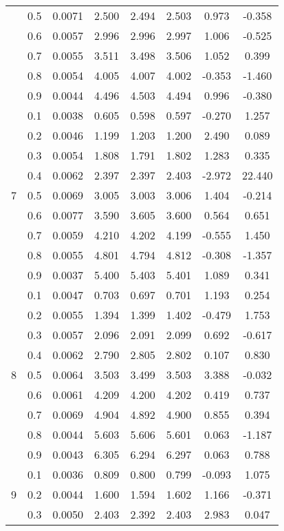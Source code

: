 \documentclass[11pt,a4paper]{report}
\begin{document}
\begin{longtable}{ | c | c || c | c | c | c | c | c | }
 & 0.5 & 0.0071 & 2.500 & 2.494 & 2.503 & 0.973 & -0.358 \\
 & 0.6 & 0.0057 & 2.996 & 2.996 & 2.997 & 1.006 & -0.525 \\
 & 0.7 & 0.0055 & 3.511 & 3.498 & 3.506 & 1.052 & 0.399 \\
 & 0.8 & 0.0054 & 4.005 & 4.007 & 4.002 & -0.353 & -1.460 \\
 & 0.9 & 0.0044 & 4.496 & 4.503 & 4.494 & 0.996 & -0.380 \\
 \hline
\multirow{9}{*}{7} & 0.1 & 0.0038 & 0.605 & 0.598 & 0.597 & -0.270 & 1.257 \\
 & 0.2 & 0.0046 & 1.199 & 1.203 & 1.200 & 2.490 & 0.089 \\
 & 0.3 & 0.0054 & 1.808 & 1.791 & 1.802 & 1.283 & 0.335 \\
 & 0.4 & 0.0062 & 2.397 & 2.397 & 2.403 & -2.972 & 22.440 \\
 & 0.5 & 0.0069 & 3.005 & 3.003 & 3.006 & 1.404 & -0.214 \\
 & 0.6 & 0.0077 & 3.590 & 3.605 & 3.600 & 0.564 & 0.651 \\
 & 0.7 & 0.0059 & 4.210 & 4.202 & 4.199 & -0.555 & 1.450 \\
 & 0.8 & 0.0055 & 4.801 & 4.794 & 4.812 & -0.308 & -1.357 \\
 & 0.9 & 0.0037 & 5.400 & 5.403 & 5.401 & 1.089 & 0.341 \\
 \hline
\multirow{9}{*}{8} & 0.1 & 0.0047 & 0.703 & 0.697 & 0.701 & 1.193 & 0.254 \\
 & 0.2 & 0.0055 & 1.394 & 1.399 & 1.402 & -0.479 & 1.753 \\
 & 0.3 & 0.0057 & 2.096 & 2.091 & 2.099 & 0.692 & -0.617 \\
 & 0.4 & 0.0062 & 2.790 & 2.805 & 2.802 & 0.107 & 0.830 \\
 & 0.5 & 0.0064 & 3.503 & 3.499 & 3.503 & 3.388 & -0.032 \\
 & 0.6 & 0.0061 & 4.209 & 4.200 & 4.202 & 0.419 & 0.737 \\
 & 0.7 & 0.0069 & 4.904 & 4.892 & 4.900 & 0.855 & 0.394 \\
 & 0.8 & 0.0044 & 5.603 & 5.606 & 5.601 & 0.063 & -1.187 \\
 & 0.9 & 0.0043 & 6.305 & 6.294 & 6.297 & 0.063 & 0.788 \\
 \hline
\multirow{9}{*}{9} & 0.1 & 0.0036 & 0.809 & 0.800 & 0.799 & -0.093 & 1.075 \\
 & 0.2 & 0.0044 & 1.600 & 1.594 & 1.602 & 1.166 & -0.371 \\
 & 0.3 & 0.0050 & 2.403 & 2.392 & 2.403 & 2.983 & 0.047 \\

\end{longtable}
\end{document}
